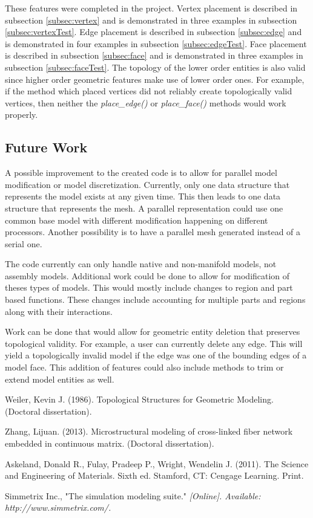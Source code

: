 \documentclass[a4paper, 12pt]{article}
\begin{document}
These features were completed in the project.
Vertex placement is described in subsection \ref{subsec:vertex}
and is demonstrated in three examples in subsection \ref{subsec:vertexTest}.
Edge placement is described in subsection \ref{subsec:edge}
and is demonstrated in four examples in subsection \ref{subsec:edgeTest}.
Face placement is described in subsection \ref{subsec:face}
and is demonstrated in three examples in subsection \ref{subsec:faceTest}.
The topology of the lower order entities is also valid since 
higher order geometric features make use of lower order ones.
For example, if the method which placed vertices did not reliably create
topologically valid vertices, then neither the \emph{place\_edge()} or 
\emph{place\_face()} methods would work properly. 

\subsection{Future Work} \label{subsec:future}
A possible improvement to the created code is to allow for parallel 
model modification or model discretization. Currently, only one
data structure that represents the model exists at any given time. 
This then leads to one data structure that represents the mesh. 
A parallel representation could use one common base model 
with different modification happening on different processors. 
Another possibility is to have a parallel mesh generated 
instead of a serial one.

The code currently can only handle native and non-manifold models, 
not assembly models. Additional work could be done to allow
for modification of theses types of models. This would mostly
include changes to region and part based functions. These changes 
include accounting for multiple parts and regions along with 
their interactions.

Work can be done that would allow for geometric entity deletion
that preserves topological validity. For example, a user can 
currently delete any edge. This will yield a topologically 
invalid model if the edge was one of the bounding edges of a 
model face. This addition of features could also
include methods to trim or extend model entities as well. 

\newpage
\begin{thebibliography}{99}

Weiler, Kevin J.
(1986).
Topological Structures for Geometric Modeling.
(Doctoral dissertation).

Zhang, Lijuan.
(2013).
Microstructural modeling of cross-linked 
fiber network embedded in continuous matrix.
(Doctoral dissertation).

Askeland, Donald R., Fulay, Pradeep P., Wright, Wendelin J.
(2011).
The Science and Engineering of Materials.
Sixth ed.
Stamford, CT: Cengage Learning.
Print.

Simmetrix Inc., 
"The simulation modeling suite."
\textit{[Online]. Available: http://www.simmetrix.com/.}

\end{thebibliography}
\end{document}

